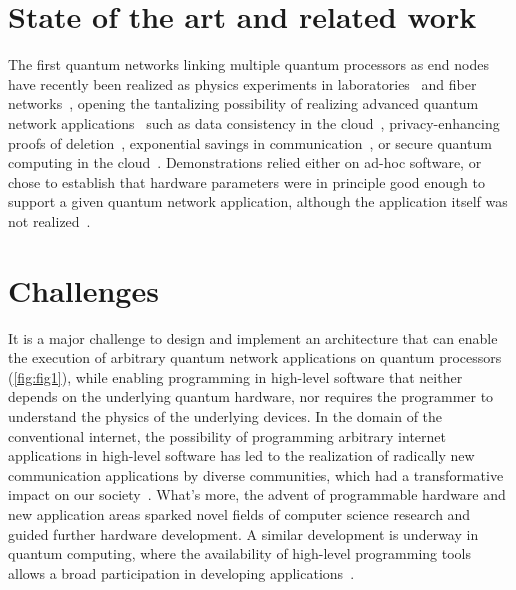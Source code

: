 \section{State of the art and related work}
The first quantum networks linking multiple quantum processors as end nodes have recently been realized as physics experiments in laboratories~\cite{moehring_2007_ion_traps,ritter_2012_elementary,hofmann_2012_heralded,stockill_2017_phasetuned,jing2019entanglement,stephenson_2020_highrate,pompili_2021_multinode,krutyanskiy_entanglement_2023} and fiber networks~\cite{liu2024creation,stolk2024metropolitan,knaut2024entanglement}, opening the tantalizing possibility of realizing advanced quantum network applications~\cite{wehner_2018_stages} such as data consistency in the cloud~\cite{benor_2005_byzantine}, privacy-enhancing proofs of deletion~\cite{poremba_quantum_2022}, exponential savings in communication~\cite{guerin_exponential_2016}, or secure quantum computing in the cloud~\cite{broadbent_2009_ubqc,childs_2005_secure_qc}. Demonstrations relied either on ad-hoc software, or chose to establish that hardware parameters were in principle good enough to support a given quantum network application, although the application itself was not realized~\cite{nadlinger_device-independent_2022,liu_2022_photonic_diqkd,zhang_2022_diqkd}.

\section{Challenges}
It is a major challenge to design and implement an architecture that can enable the execution of arbitrary quantum network applications on quantum processors (\cref{fig:fig1}), while enabling programming in high-level software that neither depends on the underlying quantum hardware, nor requires the programmer to understand the physics of the underlying devices.  In the domain of the conventional internet, the possibility of programming arbitrary internet applications in high-level software has led to the realization of radically new communication applications by diverse communities, which had a transformative impact on our society~\cite{castells_impact_2013}. What's more, the advent of programmable hardware and new application areas sparked novel fields of computer science research and guided further hardware development.  A similar development is underway in quantum computing, where the availability of high-level programming tools allows a broad participation in developing applications~\cite{noauthor_quantum_2024}.


\begin{xstretch}
\printbibliography[heading=subbibintoc,title={References},notcategory=noprint]
\end{xstretch}
